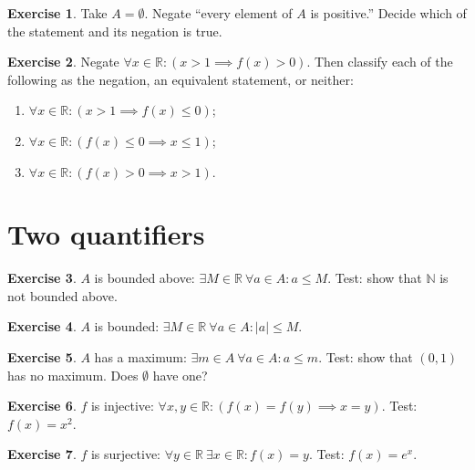 \documentclass{workbook}
\theoremstyle{definition}
\newtheorem{exercise}{Exercise}[section]
\newcommand{\N}{\mathbb{N}}
\newcommand{\R}{\mathbb{R}}
\begin{document}
\begin{exercise}\label{ex:vacuous}
Take $A = \emptyset$. Negate ``every element of $A$ is positive.'' Decide which of the statement and its negation is true.
\end{exercise}

\begin{exercise}\label{ex:impl}
Negate $\forall x \in \R : (x > 1 \implies f(x) > 0)$. Then classify each of the following as the negation, an equivalent statement, or neither:
\begin{enumerate}
  \item $\forall x \in \R : (x > 1 \implies f(x) \le 0)$;
  \item $\forall x \in \R : (f(x) \le 0 \implies x \le 1)$;
  \item $\forall x \in \R : (f(x) > 0 \implies x > 1)$.
\end{enumerate}
\end{exercise}

\section{Two quantifiers}

\begin{exercise}\label{ex:bddabove}
$A$ is bounded above: $\exists M \in \R\ \forall a \in A : a \le M$. Test: show that $\N$ is not bounded above.
\end{exercise}

\begin{exercise}\label{ex:bdd}
$A$ is bounded: $\exists M \in \R\ \forall a \in A : |a| \le M$.
\end{exercise}

\begin{exercise}\label{ex:max}
$A$ has a maximum: $\exists m \in A\ \forall a \in A : a \le m$. Test: show that $(0,1)$ has no maximum. Does $\emptyset$ have one?
\end{exercise}

\begin{exercise}\label{ex:inj}
$f$ is injective: $\forall x, y \in \R : (f(x) = f(y) \implies x = y)$. Test: $f(x) = x^2$.
\end{exercise}

\begin{exercise}\label{ex:surj}
$f$ is surjective: $\forall y \in \R\ \exists x \in \R : f(x) = y$. Test: $f(x) = e^x$.
\end{exercise}
\end{document}
